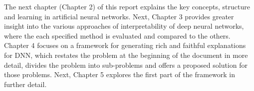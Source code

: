 


The next chapter (Chapter 2) of this report explains the key concepts, structure and learning in artificial neural networks. Next, Chapter 3 provides greater insight into the various approaches of interpretability of deep neural networks, where the each specified method is evaluated and compared to the others. Chapter 4 focuses on a framework for generating rich and faithful explanations for DNN, which restates the problem at the beginning of the document in more detail, divides the problem into sub-problems and offers a proposed solution for those problems. Next, Chapter 5 explores the first part of the framework in further detail.

